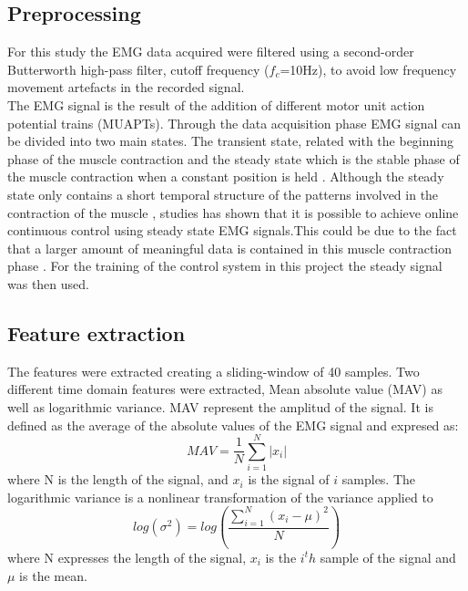 \documentclass[a4paper, 10pt, conference]{ieeeconf}      %
\begin{document}
	
	\subsection{Preprocessing}
	For this study the EMG data acquired were filtered using a second-order Butterworth high-pass filter, cutoff frequency ($f_c$=10Hz), to avoid low frequency movement artefacts in the recorded signal.\\
	The EMG signal is the result of the addition of different motor unit action potential trains (MUAPTs). Through the data acquisition phase EMG signal can be divided into two main states. The transient state, related with the beginning phase of the muscle contraction and the steady state which is the stable phase of the muscle contraction when a constant position is held \cite{mobarak2014}. Although the steady state only contains a short temporal structure of the patterns involved in the contraction of the muscle \cite{mobarakm2014}, studies has shown that it is possible to achieve online continuous control using steady state EMG signals.This could be due to the fact that a larger amount of meaningful data is contained in this muscle contraction phase \cite{mobarakm2014}. For the training of the control system in this project the steady signal was then used.
	
	\subsection{Feature extraction}
	The features were extracted creating a sliding-window of 40 samples. %
	Two different time domain features were extracted, Mean absolute value (MAV) as well as logarithmic variance. MAV represent the amplitud of the signal. It is defined as the average of the absolute values of the EMG signal and expresed as:
	\begin{equation}
	MAV = \frac{1}{N}\sum\limits_{i=1}^N|x_i|
	\end{equation}
	where N is the length of the signal, and $x_i$ is the signal of $i$ samples.
	The logarithmic variance is a nonlinear transformation of the variance applied to %
	\begin{equation} \label{eq:logvar}
	log(\sigma^2) = log(\frac{\sum\limits_{i=1}^N(x_i - \mu)^2}{N})
	\end{equation}
	where N expresses the length of the signal, $x_i$ is the $i^th$ sample of the signal and $\mu$ is the mean.
\end{document}
